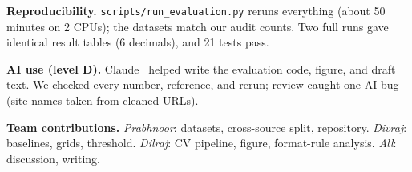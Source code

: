 \documentclass[sigconf,nonacm]{acmart}
\begin{document}
\textbf{Reproducibility.} \texttt{scripts/run\_evaluation.py} reruns everything (about 50 minutes on 2 CPUs); the datasets match our audit counts. Two full runs gave identical result tables (6 decimals), and 21 tests pass.

\smallskip\noindent\textbf{AI use (level D).} Claude~\cite{claude} helped write the evaluation code, figure, and draft text. We checked every number, reference, and rerun; review caught one AI bug (site names taken from cleaned URLs).

\smallskip\noindent\textbf{Team contributions.} \emph{Prabhnoor}: datasets, cross-source split, repository. \emph{Divraj}: baselines, grids, threshold. \emph{Dilraj}: CV pipeline, figure, format-rule analysis. \emph{All}: discussion, writing.



\end{document}
